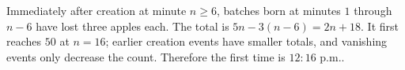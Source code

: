 Immediately after creation at minute $n\ge6$, batches born at minutes $1$ through $n-6$ have lost three apples each. The total is $5n-3(n-6)=2n+18$. It first reaches $50$ at $n=16$; earlier creation events have smaller totals, and vanishing events only decrease the count. Therefore the first time is $\boxed{12{:}16\text{ p.m.}}$.
